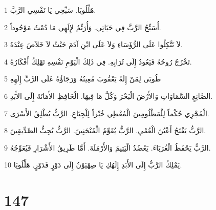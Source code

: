 \par 1 هَلِّلُويَا. سَبِّحِي يَا نَفْسِي الرَّبَّ.
\par 2 أُسَبِّحُ الرَّبَّ فِي حَيَاتِي. وَأُرَنِّمُ لإِلَهِي مَا دُمْتُ مَوْجُوداً.
\par 3 لاَ تَتَّكِلُوا عَلَى الرُّؤَسَاءِ وَلاَ عَلَى ابْنِ آدَمَ حَيْثُ لاَ خَلاَصَ عِنْدَهُ.
\par 4 تَخْرُجُ رُوحُهُ فَيَعُودُ إِلَى تُرَابِهِ. فِي ذَلِكَ الْيَوْمِ نَفْسِهِ تَهْلِكُ أَفْكَارُهُ.
\par 5 طُوبَى لِمَنْ إِلَهُ يَعْقُوبَ مُعِينُهُ وَرَجَاؤُهُ عَلَى الرَّبِّ إِلَهِهِ
\par 6 الصَّانِعِ السَّمَاوَاتِ وَالأَرْضَ الْبَحْرَ وَكُلَّ مَا فِيهَا. الْحَافِظِ الأَمَانَةَ إِلَى الأَبَدِ.
\par 7 الْمُجْرِي حُكْماً لِلْمَظْلُومِينَ الْمُعْطِي خُبْزاً لِلْجِيَاعِ. الرَّبُّ يُطْلِقُ الأَسْرَى.
\par 8 الرَّبُّ يَفْتَحُ أَعْيُنَ الْعُمْيِ. الرَّبُّ يُقَوِّمُ الْمُنْحَنِينَ. الرَّبُّ يُحِبُّ الصِّدِّيقِينَ.
\par 9 الرَّبُّ يَحْفَظُ الْغُرَبَاءَ. يَعْضُدُ الْيَتِيمَ وَالأَرْمَلَةَ. أَمَّا طَرِيقُ الأَشْرَارِ فَيُعَوِّجُهُ.
\par 10 يَمْلِكُ الرَّبُّ إِلَى الأَبَدِ إِلَهُكِ يَا صِهْيَوْنُ إِلَى دَوْرٍ فَدَوْرٍ. هَلِّلُويَا.

\chapter{147}

